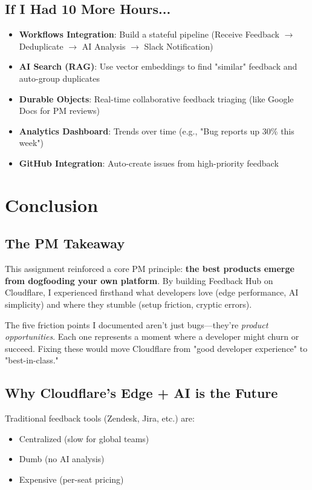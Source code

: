 \documentclass[11pt,a4paper]{article}
\begin{document}
\subsection{If I Had 10 More Hours...}

\begin{itemize}[leftmargin=*, itemsep=0.5em]
    \item \textbf{Workflows Integration}: Build a stateful pipeline (Receive Feedback $\rightarrow$ Deduplicate $\rightarrow$ AI Analysis $\rightarrow$ Slack Notification)
    \item \textbf{AI Search (RAG)}: Use vector embeddings to find "similar" feedback and auto-group duplicates
    \item \textbf{Durable Objects}: Real-time collaborative feedback triaging (like Google Docs for PM reviews)
    \item \textbf{Analytics Dashboard}: Trends over time (e.g., "Bug reports up 30\% this week")
    \item \textbf{GitHub Integration}: Auto-create issues from high-priority feedback
\end{itemize}

\newpage

\section{Conclusion}

\subsection{The PM Takeaway}

This assignment reinforced a core PM principle: \textbf{the best products emerge from dogfooding your own platform}. By building Feedback Hub on Cloudflare, I experienced firsthand what developers love (edge performance, AI simplicity) and where they stumble (setup friction, cryptic errors).

The five friction points I documented aren't just bugs—they're \textit{product opportunities}. Each one represents a moment where a developer might churn or succeed. Fixing these would move Cloudflare from "good developer experience" to "best-in-class."

\subsection{Why Cloudflare's Edge + AI is the Future}

Traditional feedback tools (Zendesk, Jira, etc.) are:
\begin{itemize}
    \item Centralized (slow for global teams)
    \item Dumb (no AI analysis)
    \item Expensive (per-seat pricing)
\end{itemize}
\end{document}
